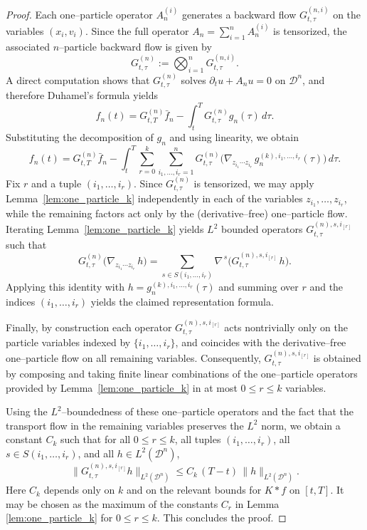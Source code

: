 \documentclass[pdflatex,sn-mathphys-num]{sn-jnl}
\theoremstyle{thmstyleone}%
\theoremstyle{thmstyletwo}%
\theoremstyle{thmstylethree}%
\begin{document}
\begin{proof}
Each one--particle operator $A_n^{(i)}$ generates a backward flow
$G^{(n,i)}_{t,\tau}$ on the variables $(x_i,v_i)$. Since the full operator
$A_n=\sum_{i=1}^n A_n^{(i)}$ is tensorized, the associated $n$--particle backward
flow is given by
\[
G^{(n)}_{t,\tau}:=\bigotimes_{i=1}^n G^{(n,i)}_{t,\tau}.
\]
A direct computation shows that $G^{(n)}_{t,\tau}$ solves
$\partial_t u + A_n u = 0$ on $\mathcal D^n$, and therefore Duhamel’s formula yields
\[
f_n(t)
=
G^{(n)}_{t,T}\bar f_n
-
\int_t^T G^{(n)}_{t,\tau} g_n(\tau)\,d\tau.
\]
Substituting the decomposition of $g_n$ and using linearity, we obtain
\[
f_n(t)
=
G^{(n)}_{t,T}\bar f_n
-
\int_t^T
\sum_{r=0}^k
\sum_{i_1,\dots,i_r=1}^n
G^{(n)}_{t,\tau}
\big(
\nabla_{z_{i_1}\cdots z_{i_r}}\, g_n^{(k),i_1,\dots,i_r}(\tau)
\big)\,d\tau.
\]
Fix $r$ and a tuple $(i_1,\dots,i_r)$. Since $G^{(n)}_{t,\tau}$ is tensorized, we
may apply Lemma~\ref{lem:one_particle_k} independently in each of the variables
$z_{i_1},\dots,z_{i_r}$, while the remaining factors act only by the (derivative--free)
one--particle flow. Iterating Lemma~\ref{lem:one_particle_k} yields
$L^2$ bounded operators $G^{(n),s,i_{[r]}}_{t,\tau}$ such that
\[
G^{(n)}_{t,\tau}
\big(
\nabla_{z_{i_1}\cdots z_{i_r}}\, h
\big)
=
\sum_{s\in S(i_1,\dots,i_r)}
\nabla^{\,s}\Big(
G^{(n),s,i_{[r]}}_{t,\tau}\, h
\Big).
\]
Applying this identity with
$h=g_n^{(k),i_1,\dots,i_r}(\tau)$ and summing over $r$ and the indices
$(i_1,\dots,i_r)$ yields the claimed representation formula.

\noindent
Finally, by construction each operator $G^{(n),s,i_{[r]}}_{t,\tau}$ acts nontrivially
only on the particle variables indexed by $\{i_1,\dots,i_r\}$, and coincides with
the derivative--free one--particle flow on all remaining variables. Consequently,
$G^{(n),s,i_{[r]}}_{t,\tau}$ is obtained by composing and taking finite linear
combinations of the one--particle operators provided by
Lemma~\ref{lem:one_particle_k} in at most $0 \le r\le k$ variables.

\noindent
Using the $L^2$--boundedness of these one--particle operators and the fact that the  transport flow in the remaining variables preserves the $L^2$ norm, we obtain a
constant $C_k$ such that for all $0\le r\le k$, all tuples
$(i_1,\dots,i_r)$, all $s\in S(i_1,\dots,i_r)$, and all $h\in L^2(\mathcal D^n)$,
\[
\|G^{(n),s,i_{[r]}}_{t,\tau} h\|_{L^2(\mathcal D^n)}
\le C_k\,(T-t)\,\|h\|_{L^2(\mathcal D^n)}.
\]
Here \(C_k\) depends only on \(k\) and on the relevant bounds for
\(K*f\) on \([t,T]\). It may be chosen as the maximum of the constants
\(C_r\) in Lemma \ref{lem:one_particle_k} for \(0\le r\le k\). This concludes the proof.
\end{proof}
\end{document}
